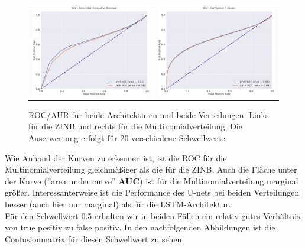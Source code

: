 \begin{figure}[h]
\begin{tabular}{cc}
\includegraphics[width=70mm]{abb/ROC_ZINFBINOM.png}&
\includegraphics[width=70mm]{abb/ROC_Categorical.png}
\end{tabular}
\caption{ROC/AUR für beide Architekturen und beide Verteilungen. Links für die ZINB und rechts für die Multinomialverteilung.
Die Auserwertung erfolgt für 20 verschiedene Schwellwerte. \label{fig:anomerz}}
\end{figure}

\noindent Wie Anhand der Kurven zu erkennen ist, ist die ROC für die Multinomialverteilung gleichmäßiger als die für die ZINB. 
Auch die Fläche unter der Kurve (''area under curve'' \textbf{AUC}) ist für die Multinomialverteilung marginal größer. Interessanterweise ist die Performance des U-nets bei beiden Verteilungen besser (auch hier nur marginal) als für die LSTM-Architektur.\\

\noindent Für den Schwellwert 0.5 erhalten wir in beiden Fällen ein relativ gutes Verhältnis von true positiv zu false positiv. In den nachfolgenden Abbildungen ist die Confusionmatrix für diesen Schwellwert zu sehen.


